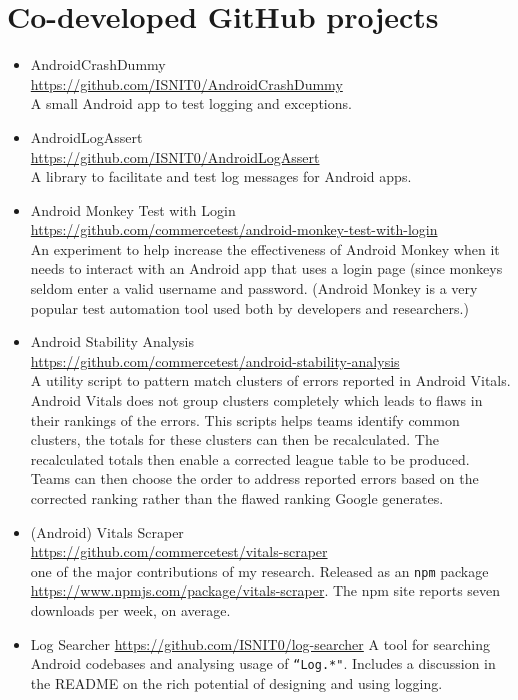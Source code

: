 \section{Co-developed GitHub projects}
\begin{itemize}
    \item AndroidCrashDummy\\ \url{https://github.com/ISNIT0/AndroidCrashDummy}\\ A small Android app to test logging and exceptions.
    \item AndroidLogAssert\\ \url{https://github.com/ISNIT0/AndroidLogAssert}\\ A library to facilitate and test log messages for Android apps.
    \item Android Monkey Test with Login \\ \url{https://github.com/commercetest/android-monkey-test-with-login}\\ An experiment to help increase the effectiveness of Android Monkey when it needs to interact with an Android app that uses a login page (since monkeys seldom enter a valid username and password. (Android Monkey is a very popular test automation tool used both by developers and researchers.) 
    \item Android Stability Analysis\\ \url{https://github.com/commercetest/android-stability-analysis}\\ A utility script to pattern match clusters of errors reported in Android Vitals. Android Vitals does not group clusters completely which leads to flaws in their rankings of the errors. This scripts helps teams identify common clusters, the totals for these clusters can then be recalculated. The recalculated totals then enable a corrected league table to be produced. Teams can then choose the order to address reported errors based on the corrected ranking rather than the flawed ranking Google generates.
    \item (Android) Vitals Scraper\\ \url{https://github.com/commercetest/vitals-scraper}\\ one of the major contributions of my research. Released as an \texttt{npm} package \url{https://www.npmjs.com/package/vitals-scraper}. The npm site reports seven downloads per week, on average.
    \item Log Searcher \url{https://github.com/ISNIT0/log-searcher} A tool for searching Android codebases and analysing usage of \texttt{``Log.*"}. Includes a discussion in the README on the rich potential of designing and using logging.

\end{itemize}
